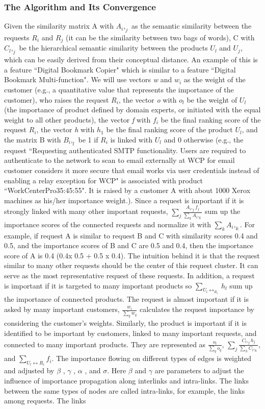 \documentclass[sigconf]{acmart}
\begin{document}
\subsubsection{The Algorithm and Its Convergence}
Given the similarity matrix A with $A_i,_j$ as the semantic similarity between the requests $R_i$ and $R_j$ (it can be the similarity between two bags of words), C with $C_l,_j$ be the hierarchical semantic similarity between the products $U_l$ and $U_j$, which can be easily derived from their conceptual distance. An example of this is a feature ``Digital Bookmark Copier" which is similar to a feature ``Digital Bookmark Multi-function". We will use vectors \textit{w} and $w_i$ as the weight of the customer (e.g., a quantitative value that represents the importance of the customer), who raises the request $R_i$, the vector \textit{o} with $o_l$ be the weight of $U_l$ (the importance of product defined by domain experts, or initiated with the equal weight to all other products), the vector \textit{f} with $f_i$ be the final ranking score of the request $R_i$, the vector \textit{h} with $h_1$ be the final ranking score of the product $U_l$, and the matrix B with $B_i,_l$ be 1 if $R_i$ is linked with $U_l$ and 0 otherwise (e.g., the request ``Requesting authenticated SMTP functionality. Users are required to authenticate to the network to scan to email externally at WCP for email customer considers it more secure that email works via user credentials instead of enabling a relay exception for WCP" is associated with product ``WorkCenterPro35:45:55". It is raised by a customer A with about 1000 Xerox machines as his/her importance weight.). Since a request is important if it is strongly linked with many other important requests, $\sum_j \frac{A_i,_jf_j}{\sum_kA_i,_k}$ sum up the importance scores of the connected requests and normalize it with $\sum_kA_i,_k$. For example, if request A is similar to request B and C with similarity scores 0.4 and 0.5, and the importance scores of B and C are 0.5 and 0.4, then the importance score of A is 0.4 (0.4x 0.5 + 0.5 x 0.4). The intuition behind it is that the request similar to many other requests should be the center of this request cluster. It can serve as the most representative request of these requests. In addition, a request is important if it is targeted to many important products so $\sum_{U_l\leftrightarrow_R_i}h_l$ sum up the importance of connected products. The request is almost important if it is asked by many important customers, $\frac{w_i}{\sum_qw_q}$ calculates the request importance by considering the customer's weights. Similarly, the product is important if it is identified to be important by customers, linked to many important requests, and connected to many important products. They are represented as $\frac{o_l}{\sum_qo_q}$, $\sum_j\frac{C_l,_jh_j}{\sum_hC_l,_k}$, and $\sum_{U_l\leftrightarrow R_i}f_i.$ The importance flowing on different types of edges is weighted and adjusted by $\beta$ , $\gamma$ , $\alpha$ , and  $\sigma$. Here $\beta$ and $\gamma$ are parameters to adjust the influence of importance propagation along interlinks and intra-links. The links between the same types of nodes are called intra-links, for example, the links among requests. The links 
\end{document}
